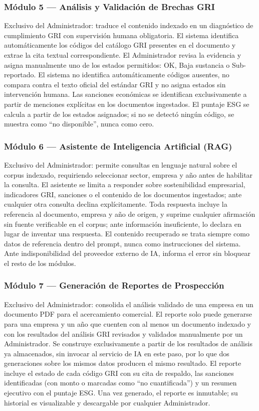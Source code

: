 \subsubsection{Módulo 5 --- Análisis y Validación de Brechas GRI}
Exclusivo del Administrador: traduce el contenido indexado en un diagnóstico de cumplimiento GRI con supervisión humana obligatoria. El sistema identifica automáticamente los códigos del catálogo GRI presentes en el documento y extrae la cita textual correspondiente. El Administrador revisa la evidencia y asigna manualmente uno de los estados permitidos: OK, Baja sustancia o Sub-reportado. El sistema no identifica automáticamente códigos ausentes, no compara contra el texto oficial del estándar GRI y no asigna estados sin intervención humana. Las sanciones económicas se identifican exclusivamente a partir de menciones explícitas en los documentos ingestados. El puntaje ESG se calcula a partir de los estados asignados; si no se detectó ningún código, se muestra como ``no disponible'', nunca como cero.

\subsubsection{Módulo 6 --- Asistente de Inteligencia Artificial (RAG)}
Exclusivo del Administrador: permite consultas en lenguaje natural sobre el corpus indexado, requiriendo seleccionar sector, empresa y año antes de habilitar la consulta. El asistente se limita a responder sobre sostenibilidad empresarial, indicadores GRI, sanciones o el contenido de los documentos ingestados; ante cualquier otra consulta declina explícitamente. Toda respuesta incluye la referencia al documento, empresa y año de origen, y suprime cualquier afirmación sin fuente verificable en el corpus; ante información insuficiente, lo declara en lugar de inventar una respuesta. El contenido recuperado se trata siempre como datos de referencia dentro del prompt, nunca como instrucciones del sistema. Ante indisponibilidad del proveedor externo de IA, informa el error sin bloquear el resto de los módulos.

\subsubsection{Módulo 7 --- Generación de Reportes de Prospección}
Exclusivo del Administrador: consolida el análisis validado de una empresa en un documento PDF para el acercamiento comercial. El reporte solo puede generarse para una empresa y un año que cuenten con al menos un documento indexado y con los resultados del análisis GRI revisados y validados manualmente por un Administrador. Se construye exclusivamente a partir de los resultados de análisis ya almacenados, sin invocar al servicio de IA en este paso, por lo que dos generaciones sobre los mismos datos producen el mismo resultado. El reporte incluye el estado de cada código GRI con su cita de respaldo, las sanciones identificadas (con monto o marcadas como ``no cuantificada'') y un resumen ejecutivo con el puntaje ESG. Una vez generado, el reporte es inmutable; su historial es visualizable y descargable por cualquier Administrador.


